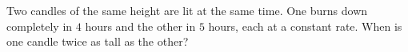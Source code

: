 Two candles of the same height are lit at the same time. One burns down completely in $4$ hours and the other in $5$ hours, each at a constant rate. When is one candle twice as tall as the other?
